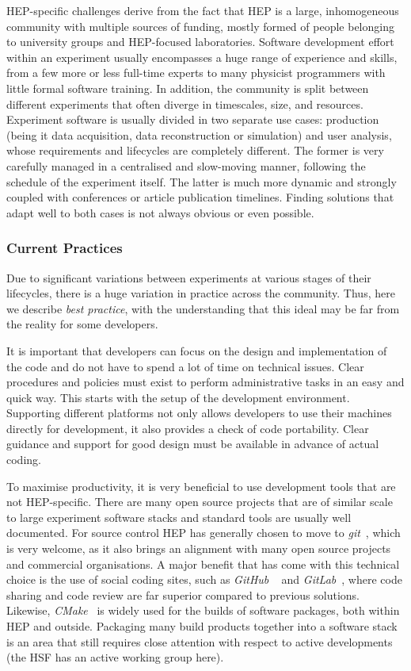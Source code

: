 HEP-specific challenges derive from the fact that HEP is a large,
inhomogeneous community with multiple sources of funding, mostly formed
of people belonging to university groups and HEP-focused laboratories.
Software development effort within an experiment usually encompasses a
huge range of experience and skills, from a few more or less full-time
experts to many physicist programmers with little formal software
training. In addition, the community is split between different
experiments that often diverge in timescales, size, and resources.
Experiment software is usually divided in two separate use cases:
production (being it data acquisition, data reconstruction or
simulation) and user analysis, whose requirements and lifecycles are
completely different. The former is very carefully managed in a
centralised and slow-moving manner, following the schedule of the
experiment itself. The latter is much more dynamic and strongly coupled
with conferences or article publication timelines. Finding solutions
that adapt well to both cases is not always obvious or even possible.

\subsubsection*{Current Practices}

Due to significant variations between experiments at various stages of
their lifecycles, there is a huge variation in practice across the
community. Thus, here we describe \emph{best practice}, with the
understanding that this ideal may be far from the reality for some
developers.

It is important that developers can focus on the design and
implementation of the code and do not have to spend a lot of time on
technical issues. Clear procedures and policies must exist to perform
administrative tasks in an easy and quick way. This starts with the
setup of the development environment. Supporting different platforms not
only allows developers to use their machines directly for
development, it also provides a check of code portability. Clear
guidance and support for good design must be available in advance of
actual coding.

To maximise productivity, it is very beneficial to use development tools
that are not HEP-specific. There are many open source projects that are
of similar scale to large experiment software stacks and standard tools
are usually well documented. For source control HEP has generally chosen
to move to \emph{git}~\cite{git},
which is very welcome, as it also brings an
alignment with many open source projects and commercial organisations.
A major benefit that has come with this technical choice is the use
of social coding sites, such as \emph{GitHub} ~\cite{GitHub}
and \emph{GitLab}~\cite{GitLab}, where
code sharing and code review are far superior compared to previous
solutions.
Likewise, \emph{CMake}~\cite{CMake}
is widely used for the builds of software
packages, both within HEP and outside. Packaging many build products
together into a software stack is an area that still requires close
attention with respect to active developments (the HSF has an active
working group here).

